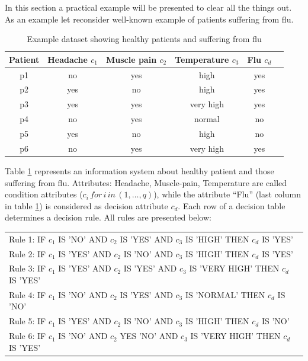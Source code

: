 In this section a practical example will be presented to clear all the things
out. As an example let reconsider well-known example of patients suffering from
flu. 
\begin{table}[H] 
    \centering
    \caption{Example dataset showing healthy patients and suffering from flu}
    \begin{tabular}{|c|c|c|c|c|c|}
        \hline 
    Patient & Headache $c_1$& Muscle pain $c_2$& Temperature $c_3$& Flu $c_d$\\ \hline \hline
    p1 & no & yes & high & yes \\ \hline
    p2 & yes & no & high & yes \\ \hline
    p3 & yes & yes & very high & yes \\ \hline
    p4 & no & yes & normal & no \\ \hline
    p5 & yes & no & high & no \\ \hline
    p6 & no & yes & very high & yes \\ \hline    
    \end{tabular}
    \label{tab:example_rough_set}
\end{table}
Table \ref{tab:example_rough_set} represents an information system about
healthy patient and those suffering from flu. Attributes: Headache,
Muscle-pain, Temperature are called condition attributes ($c_i \,for \, i \,in
\, (1, \ldots, q)$), while the attribute ``Flu'' (last column in table \ref{tab:example_rough_set}) is considered as
decision attribute $c_d$. Each row of a decision table determines a decision
rule. All rules are presented below:

\begin{tabular}[H]{l}
    Rule 1:  IF $c_1$ IS 'NO' AND $c_2$ IS 'YES' AND $c_3$ IS 'HIGH' THEN $c_d$
    IS 'YES' \\
    Rule 2:  IF $c_1$ IS 'YES' AND $c_2$ IS 'NO' AND $c_3$ IS 'HIGH' THEN $c_d$
    IS 'YES' \\
    Rule 3:  IF $c_1$ IS 'YES' AND $c_2$ IS 'YES' AND $c_3$ IS 'VERY HIGH' THEN
    $c_d$ IS 'YES' \\
    Rule 4:  IF $c_1$ IS 'NO' AND $c_2$ IS 'YES' AND $c_3$ IS 'NORMAL' THEN
    $c_d$ IS 'NO' \\
    Rule 5:  IF $c_1$ IS 'YES' AND $c_2$ IS 'NO' AND $c_3$ IS 'HIGH' THEN $c_d$
    IS 'NO' \\
    Rule 6:  IF $c_1$ IS 'NO' AND $c_2$ YES 'NO' AND $c_3$ IS 'VERY HIGH' THEN
    $c_d$ IS 'YES'  
\end{tabular}


